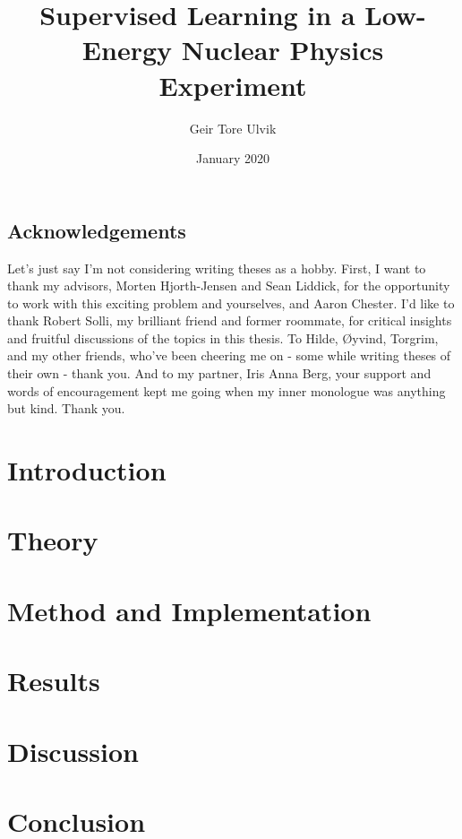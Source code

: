 \documentclass[twoside,english]{uiofysmaster}
\author{Geir Tore Ulvik}
\title{Supervised Learning in a Low-Energy Nuclear Physics Experiment}
\date{January 2020}
\begin{document}
\maketitle

\tableofcontents
\listoffigures

\newpage
\section*{Acknowledgements}
Let's just say I'm not considering writing theses as a hobby.
First, I want to thank my advisors, Morten Hjorth-Jensen and Sean Liddick, for the
opportunity to work with this exciting problem and yourselves, and Aaron Chester.
I'd like to thank Robert Solli, my brilliant friend and former roommate, for critical insights
and fruitful discussions of the topics in this thesis.
To Hilde, Øyvind, Torgrim, and my other friends, who've been cheering me on - some while writing theses 
of their own - thank you.
And to my partner, Iris Anna Berg, your support and words of encouragement kept me going
when my inner monologue was anything but kind. Thank you.
\newpage


\chapter{Introduction}

\chapter{Theory}

\chapter{Method and Implementation}

\chapter{Results}

\chapter{Discussion}

\chapter{Conclusion}

\begin{appendices}
    
\end{appendices}



\end{document}
